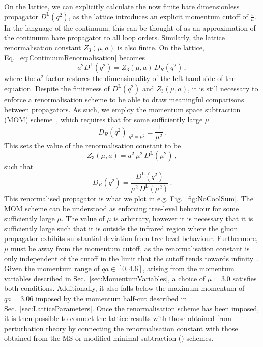 On the lattice, we can explicitly calculate the now finite bare dimensionless propagator $D^\text{L}(q^2)$, as the lattice introduces an explicit momentum cutoff of $\frac{\pi}{a}$. In the language of the continuum, this can be thought of as an approximation of the continuum bare propagator to all loop orders. Similarly, the lattice renormalisation constant $Z_3(\mu, a)$ is also finite. On the lattice, Eq.~\eqref{eq:ContinuumRenormalisation} becomes
%
\begin{equation}
a^2 D^\text{L}(q^2) = Z_3(\mu, a)\, D_R(q^2)\, ,
\label{eq:LatticeRenormalisation}
\end{equation}
%
where the $a^2$ factor restores the dimensionality of the left-hand side of the equation. Despite the finiteness of $D^\text{L}(q^2)$ and $Z_3(\mu, a)$, it is still necessary to enforce a renormalisation scheme to be able to draw meaningful comparisons between propagators. As such, we employ the momentum space subtraction (MOM) scheme~\cite{Bowman:2004jm,Leinweber:1998uu,Bonnet:2001uh}, which requires that for some sufficiently large $\mu$
%
\begin{equation}
D_R(q^2)\big|_{q^2=\mu^2}=\frac{1}{\mu^2}\, .
\end{equation}
%
This sets the value of the renormalisation constant to be
%
\begin{equation}
Z_3(\mu,a) = a^2 \, \mu^2 \, D^\text{L}(\mu^2)\, ,
\end{equation}
such that
%
\begin{equation}
D_R(q^2) = \frac{D^\text{L}(q^2)}{\mu^2 \, D^\text{L}(\mu^2)}\, .
\end{equation}
%
This renormalised propagator is what we plot in e.g. Fig.~\ref{fig:NoCoolSum}. The MOM scheme can be understood as enforcing tree-level behaviour for some sufficiently large $\mu$. The value of $\mu$ is arbitrary, however it is necessary that it is sufficiently large such that it is outside the infrared region where the gluon propagator exhibits substantial deviation from tree-level behaviour. Furthermore, $\mu$ must be away from the momentum cutoff, as the renormalisation constant is only independent of the cutoff in the limit that the cutoff tends towards infinity~\cite{Bonnet:2001uh,Boucaud:2006pc}. Given the momentum range of $qa\in [0,4.6]$, arising from the momentum variables described in Sec.~\ref{sec:MomentumVariables}, a choice of $\mu =3.0$ satisfies both conditions. Additionally, it also falls below the maximum momentum of $qa = 3.06$ imposed by the momentum half-cut described in Sec.~\ref{sec:LatticeParameters}. Once the renormalisation scheme has been imposed, it is then possible to connect the lattice results with those obtained from perturbation theory by connecting the renormalisation constant with those obtained from the MS or modified minimal subtraction () schemes.\\

